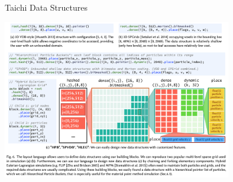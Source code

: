 \begin{frame}{Taichi Data Structures}
  \begin{center}
    \includegraphics[width=10cm]{taichi_data_structures.png}
  \end{center}
\end{frame}


